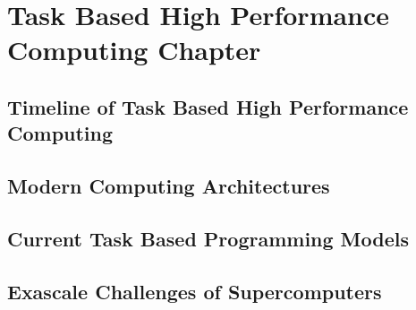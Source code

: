 \chapter{Task Based High Performance Computing Chapter \label{chap:hpc}}

\section{Timeline of Task Based High Performance Computing}

\section{Modern Computing Architectures}

\section{Current Task Based Programming Models}

\section{Exascale Challenges of Supercomputers}
